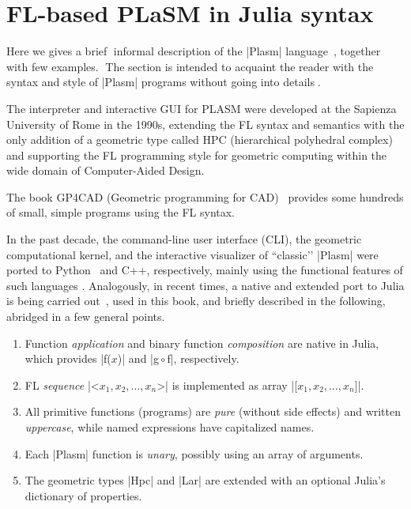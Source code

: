\section{FL-based PLaSM in Julia syntax}\label{sect:2-2}

Here we gives a brief informal description of the |Plasm| language~\cite{Paoluzzi:1995:GPP:212332.212349,Paoluzzi2003a}, together with few examples. The section is intended to acquaint the reader with the syntax and style of |Plasm| programs without going into details. 

The interpreter and interactive GUI for PLASM were developed at the Sapienza University of Rome in the 1990s, extending the FL syntax and semantics with the only addition of a geometric type called HPC (hierarchical polyhedral complex) and supporting the FL programming style for geometric computing within the wide domain of Computer-Aided Design.

The book GP4CAD (Geometric programming for CAD)~\cite{Paoluzzi2003a} provides some hundreds of small, simple programs using the FL syntax.

In the past decade, the command-line user interface (CLI), the geometric computational kernel, and the interactive visualizer of ``classic’’ |Plasm| were ported to Python~\cite{pyplasm:2018} and C++, respectively, mainly using the functional features of such languages \cite{dia-report:2009}. Analogously, in recent times, a native and extended port to Julia is being carried out~\cite{plasm:2023}, used in this book, and briefly described in the following, abridged in a few general points.

\begin{enumerate}
\item Function \emph{application} and binary function \emph{composition} are native in Julia, which provides  |f($x$)| and  |g${}\circ{}$f|, respectively.
\item FL \emph{sequence} |<$x_1, x_2, \ldots, x_n$>| is implemented as array |[$x_1, x_2, \ldots, x_n$]|.
\item All primitive functions (programs) are \emph{pure} (without side effects) and written \emph{uppercase}, while named expressions have capitalized names. 
\item Each |Plasm| function is \emph{unary}, possibly using an array of arguments. 
\item The geometric types |Hpc| and |Lar| are extended with an optional Julia’s dictionary of properties.
\end{enumerate}

